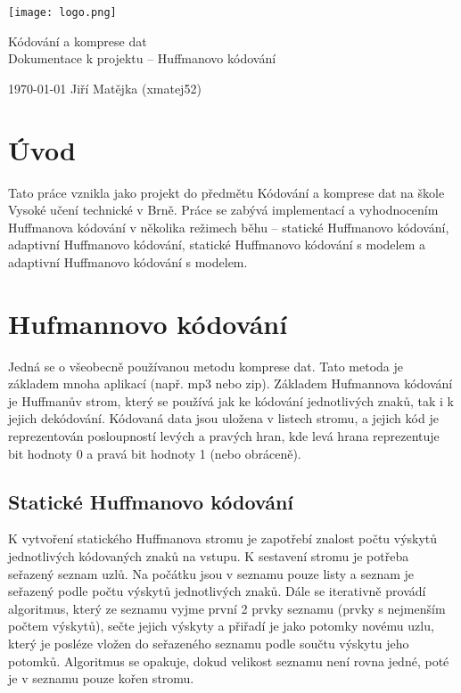 \documentclass[11pt,a4paper,titlepage]{article}
\begin{document}
		\begin{center}

			\texttt{[image: logo.png]}\\


			\LARGE
			Kódování a komprese dat\\
			Dokumentace k projektu -- Huffmanovo kódování\\

		\end{center}

	\Large{\today} \hfill Jiří Matějka (xmatej52)
	\thispagestyle{empty}
	\newpage
	\setcounter{page}{1}

    \tableofcontents
	\newpage
	\newpage

    \section{Úvod}
        Tato práce vznikla jako projekt do předmětu Kódování a komprese dat na škole Vysoké učení technické v Brně.
        Práce se zabývá implementací a vyhodnocením Huffmanova kódování v několika režimech běhu -- statické Huffmanovo kódování,
        adaptivní Huffmanovo kódování, statické Huffmanovo kódování s modelem a adaptivní Huffmanovo kódování s modelem.

    \section{Hufmannovo kódování}
        Jedná se o všeobecně používanou metodu komprese dat. Tato metoda je základem mnoha aplikací (např. mp3 nebo zip). Základem Hufmannova kódování je Huffmanův strom, který se používá jak ke kódování jednotlivých znaků, tak i k jejich dekódování. Kódovaná data jsou uložena v listech stromu, a jejich kód je reprezentován
        posloupností levých a pravých hran, kde levá hrana reprezentuje bit hodnoty 0 a pravá bit hodnoty 1 (nebo obráceně).

        \subsection{Statické Huffmanovo kódování}
            K vytvoření statického Huffmanova stromu je zapotřebí znalost počtu výskytů jednotlivých kódovaných
            znaků na vstupu. K sestavení stromu je potřeba seřazený seznam uzlů. Na počátku jsou v seznamu pouze
            listy a seznam je seřazený podle počtu výskytů jednotlivých znaků. Dále se iterativně provádí algoritmus,
            který ze seznamu vyjme první 2 prvky seznamu (prvky s nejmenším počtem výskytů), sečte jejich výskyty a
            přiřadí je jako potomky novému uzlu, který je posléze vložen do seřazeného seznamu podle součtu výskytu jeho potomků. Algoritmus se opakuje, dokud velikost seznamu není rovna jedné, poté je v seznamu pouze kořen stromu.
\end{document}
